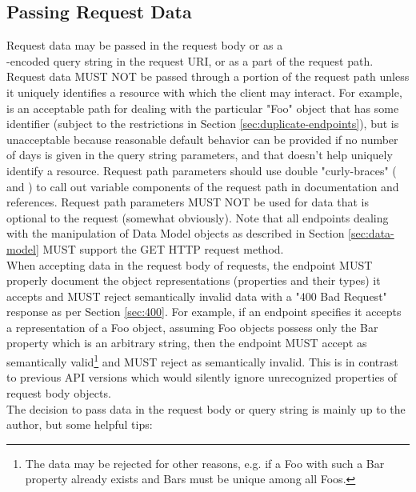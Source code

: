 \subsection{Passing Request Data}
Request data may be passed in the request body or as a\\ -encoded query string in the request URI, or as a part of the
request path. Request data MUST NOT be passed through a portion of the request path unless it uniquely identifies a resource with which the client may
interact. For example,  is an acceptable path for dealing with the particular "Foo" object that has some identifier  (subject
to the restrictions in Section \ref{sec:duplicate-endpoints}), but  is unacceptable because reasonable default behavior can
be provided if no number of days is given in the query string parameters, and that doesn't help uniquely identify a resource. Request path parameters should
use double "curly-braces" (\code{\{} and \code{\}}) to call out variable components of the request path in documentation and references. Request path parameters
MUST NOT be used for data that is optional to the request (somewhat obviously). Note that all endpoints dealing with the manipulation of Data Model objects as
described in Section \ref{sec:data-model} MUST support the GET HTTP request method.\\
When accepting data in the request body of requests, the endpoint MUST properly
document the object representations (properties and their types) it accepts and
MUST reject semantically invalid data with a "400 Bad Request" response as per
Section \ref{sec:400}. For example, if an endpoint specifies it accepts a
representation of a Foo object, assuming Foo objects possess only the Bar
property which is an arbitrary string, then the endpoint MUST accept
 as semantically valid\footnote{The data may be
rejected for other reasons, e.g. if a Foo with such a Bar property already
exists and Bars must be unique among all Foos.} and MUST reject
 as semantically invalid.
This is in contrast to previous API versions which would silently ignore
unrecognized properties of request body objects.\\
The decision to pass data in the request body or query string is mainly up to the author, but some helpful tips:

